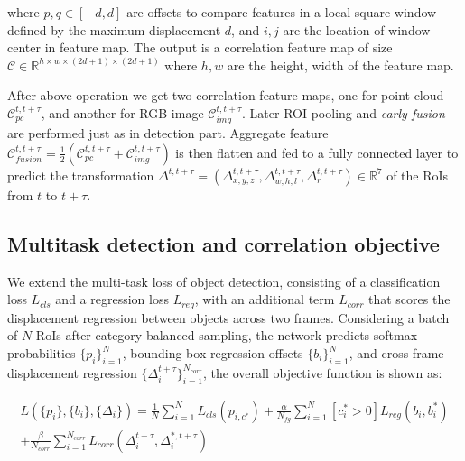 \documentclass{bmvc2k}
\begin{document}
where $p, q \in [-d, d]$ are offsets to compare features in a local square window defined by the maximum displacement $d$, and $i, j$ are the location of window center in feature map. The output is a correlation feature map of size $\mathcal{C} \in \mathbb{R}^{h \times w \times (2d+1) \times (2d+1)}$ where $h, w$ are the height, width of the feature map.

After above operation we get two correlation feature maps, one for point cloud $\mathcal{C}^{t, t+\tau}_{pc}$, and another for RGB image $\mathcal{C}^{t, t+\tau}_{img}$. Later ROI pooling and \textit{early fusion} are performed just as in detection part. Aggregate feature $\mathcal{C}^{t,t+\tau}_{fusion} = \frac{1}{2}(\mathcal{C}^{t, t+\tau}_{pc} + \mathcal{C}^{t, t+\tau}_{img})$ is then flatten and fed to a fully connected layer to predict the transformation
 $\Delta^{t, t+\tau} = (\Delta^{t,t+\tau}_{x, y, z}, \Delta^{t,t+\tau}_{w, h, l},\Delta^{t,t+\tau}_{r}) \in \mathbb{R}^7$ of the RoIs from $t$ to $t+\tau$. 

\subsection{Multitask detection and correlation objective}
We extend the multi-task loss of object detection, consisting of a classification loss $L_{cls}$ and a regression loss $L_{reg}$, with an additional term $L_{corr}$ that scores the displacement regression between objects across two frames. Considering a batch of $N$ RoIs after category balanced sampling, the network predicts softmax probabilities $\{p_i\}^N_{i=1}$, bounding box regression offsets $\{b_i\}^N_{i=1}$, and cross-frame displacement regression $\{\Delta^{t+\tau}_i\}^{N_{corr}}_{i=1}$, the overall objective function is shown as:

\begin{equation}
\begin{split}
L(\{p_i\}, \{b_i\}, \{\Delta_i\}) = \frac{1}{N} \sum^N_{i=1} L_{cls}(p_{i, c^*}) 
+ \frac{\alpha}{N_{fg}}\sum^N_{i=1} [c^*_i > 0]L_{reg}(b_i, b^*_i) \\
+ \frac{\beta}{N_{corr}} \sum^{N_{corr}}_{i=1}L_{corr}(\Delta^{t+\tau}_i, \Delta^{*, t+\tau}_i)
\end{split}
\end{equation}
\end{document}
